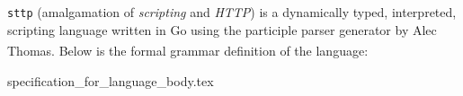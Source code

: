 \documentclass[]{full}
\theoremstyle{definition}
\begin{document}
\verb|sttp| (amalgamation of \textit{scripting} and \textit{HTTP}) is a dynamically typed, interpreted, scripting language written in Go using the participle parser generator by Alec Thomas\textsuperscript{\cite{thomas_2021}}. Below is the formal grammar definition of the language:

{specification_for_language_body.tex}

\newpage
\label{endpage}

\printbibliography
\end{document}
